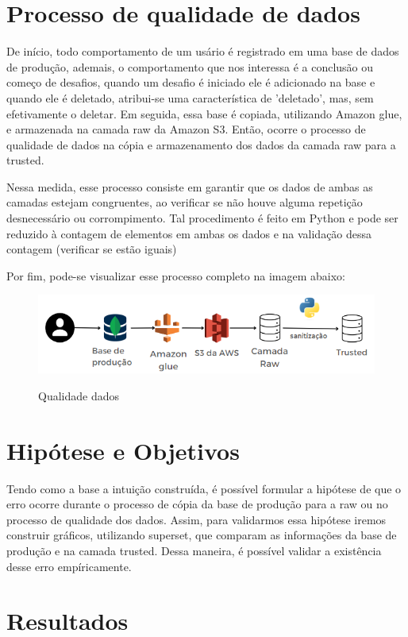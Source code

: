 \section{Processo de qualidade de dados}

De início, todo comportamento de um usário é registrado em uma base de dados de produção, ademais,  o comportamento que nos interessa é a conclusão ou começo de desafios, quando um desafio é iniciado ele é adicionado na base e quando ele é deletado, atribui-se uma característica de 'deletado', mas, sem efetivamente o deletar. Em seguida, essa base é copiada, utilizando Amazon glue, e armazenada na camada raw da Amazon S3. Então, ocorre o processo de qualidade de dados na cópia e armazenamento dos dados da camada raw para a trusted. 

Nessa medida, esse processo consiste em garantir que os dados de ambas as camadas estejam congruentes, ao verificar se não houve alguma repetição desnecessário ou corrompimento. Tal procedimento é feito em Python e pode ser reduzido à contagem de elementos em ambas os dados e na validação dessa contagem (verificar se estão iguais)

Por fim, pode-se visualizar esse processo completo na imagem abaixo:
    \begin{figure}[h!]
        \centering
        \caption{Qualidade dados}
        \includegraphics[width = .6\linewidth]{relatorios/grupo5/figuras/qualidade_dados.png}
        \label{Processo}
    \end{figure}

\section{Hipótese e Objetivos}

Tendo como a base a intuição construída, é possível formular a hipótese de que o erro ocorre durante o processo de cópia da base de produção para a raw ou no processo de qualidade dos dados. Assim, para validarmos essa hipótese iremos construir gráficos, utilizando superset, que comparam as informações da base de produção e na camada trusted. Dessa maneira, é possível validar a existência desse erro empíricamente.

\section{Resultados}

